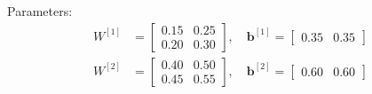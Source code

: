 \documentclass[12pt, a4paper]{report}
\theoremstyle{definition}
\begin{document}
Parameters:
\begin{align*}
W^{[1]} &= \begin{bmatrix} 0.15 & 0.25 \\ 0.20 & 0.30 \end{bmatrix}, \quad
\mathbf{b}^{[1]} = \begin{bmatrix} 0.35 & 0.35 \end{bmatrix} \\
W^{[2]} &= \begin{bmatrix} 0.40 & 0.50 \\ 0.45 & 0.55 \end{bmatrix}, \quad
\mathbf{b}^{[2]} = \begin{bmatrix} 0.60 & 0.60 \end{bmatrix}
\end{align*}
\end{document}
